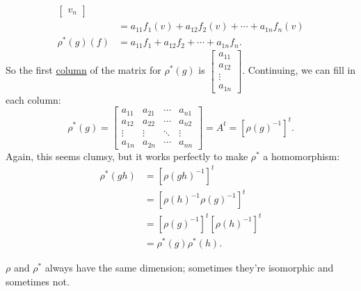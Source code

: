 \documentclass[12pt]{article}
\newcommand\inv[1]{#1^{-1}}
\theoremstyle{definition}
\begin{document}
\begin{enumerate}[resume]
\begin{equation}
\begin{split}
\begin{bmatrix}
                v_n
            \end{bmatrix} \\
            & = a_{11} f_1(v) + a_{12} f_2(v) + \dotsb + a_{1n}f_n(v) \\
            \rho^*(g)(f) & = a_{11}f_1 + a_{12}f_2 + \dotsb + a_{1n}f_n.
        \end{split}
    \end{equation}
    So the first \underline{column} of the matrix for $\rho^*(g)$ is 
    $\begin{bmatrix}
        a_{11} \\
        a_{12} \\
        \vdots \\
        a_{1n}
    \end{bmatrix}$. Continuing, we can fill in each column:
    \begin{equation}
        \rho^*(g) = 
        \begin{bmatrix}
            a_{11} & a_{21} & \cdots & a_{n1} \\
            a_{12} & a_{22} & \cdots & a_{n2} \\
            \vdots & \vdots & \ddots & \vdots \\
            a_{1n} & a_{2n} & \cdots & a_{nn} 
        \end{bmatrix}
        = A^t = \boxed{ \left[ \inv{\rho(g)} \right]^t. }
    \end{equation}
    Again, this seems clumsy, but it works perfectly to make $\rho^*$ a homomorphism:
    \begin{equation}
        \begin{split}
            \rho^*(gh) & = \left[ \inv{\rho(gh)} \right]^t \\
            & = \left[ \inv{\rho(h)} \inv{\rho(g)} \right]^t \\
            & = \left[ \inv{\rho(g)} \right]^t \left[ \inv{\rho(h)} \right]^t \\
            & = \rho^*(g) \rho^*(h).
        \end{split}
    \end{equation}
\end{enumerate}
$\rho$ and $\rho^*$ always have the same dimension; sometimes they're isomorphic and sometimes not.
\end{document}
